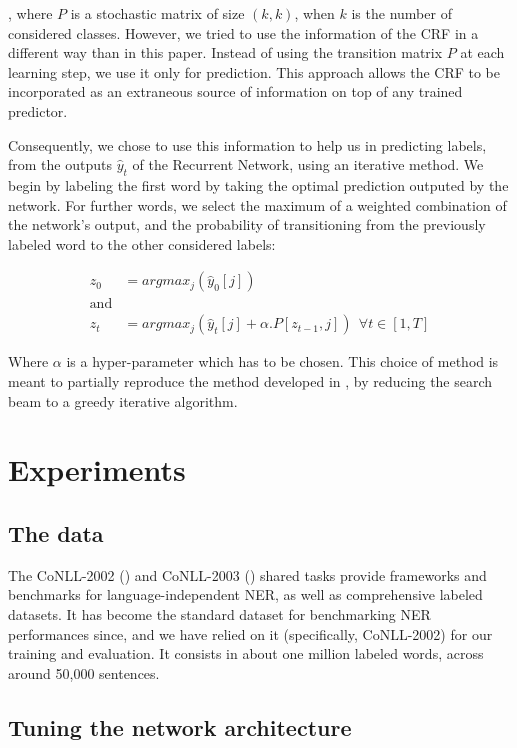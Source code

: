 \documentclass{article} %
\begin{document}
, where $P$ is a stochastic matrix of size $(k,k)$, when $k$ is the number of considered classes. However, we tried to use the information of the CRF in a different way than in this paper. Instead of using the transition matrix $P$ at each learning step, we use it only for prediction. This approach allows the CRF to be incorporated as an extraneous source of information on top of any trained predictor.

Consequently, we chose to use this information to help us in predicting labels, from the outputs $\hat{y}_t$ of the Recurrent Network, using an iterative method. We begin by labeling the first word by taking the optimal prediction outputed by the network. For further words, we select the maximum of a weighted combination of the network's output, and the probability of transitioning from the previously labeled word to the other considered labels:

\begin{align*}
z_0 &= argmax_j(\hat{y}_0[j])
\\
\text{and}&
\\
z_t &= argmax_j(\hat{y}_t[j] + \alpha.P[z_{t-1},  j]) \ \ \forall t \in [1, T]
\end{align*}


Where $\alpha$ is a hyper-parameter which has to be chosen. This
choice of method is meant to partially reproduce the method developed in \cite{lample2016neural}, by reducing the search beam to a greedy iterative algorithm.


\section{Experiments}

\subsection{The data}

The CoNLL-2002 (\cite{tjong2002introduction}) and CoNLL-2003 (\cite{tjong2003introduction}) shared tasks provide frameworks and benchmarks for language-independent NER, as well as comprehensive labeled datasets. It has become the standard dataset for benchmarking NER performances since, and we have relied on it (specifically, CoNLL-2002) for our training and evaluation. It consists in about one million labeled words, across around 50,000 sentences.

\subsection{Tuning the network architecture}
\end{document}
